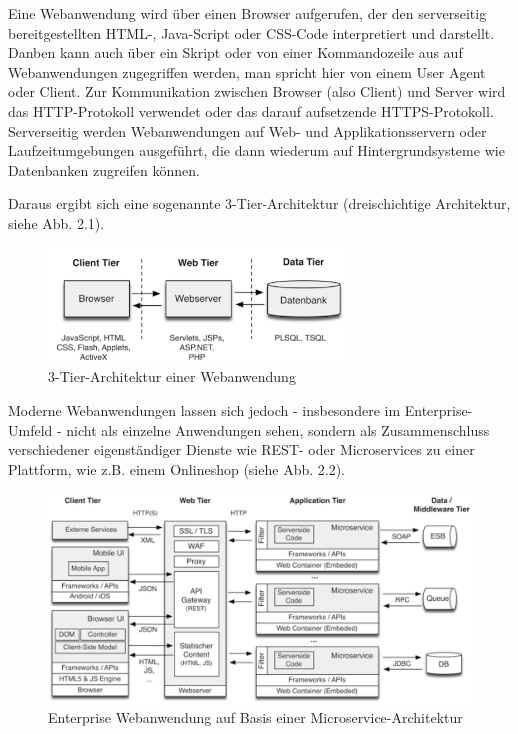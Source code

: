 \documentclass[12pt,oneside,a4paper,parskip,pointlessnumbers]{scrbook}
\begin{document}
  Eine Webanwendung wird über einen Browser aufgerufen, der den serverseitig bereitgestellten HTML-, Java-Script oder CSS-Code interpretiert und darstellt. Danben kann auch über ein Skript oder von einer Kommandozeile aus auf Webanwendungen zugegriffen werden, man spricht hier von einem User Agent oder Client.
  Zur Kommunikation zwischen Browser (also Client) und Server wird das HTTP-Protokoll verwendet oder das darauf aufsetzende HTTPS-Protokoll.
  Serverseitig werden Webanwendungen auf Web- und Applikationsservern oder Laufzeitumgebungen ausgeführt, die dann wiederum auf Hintergrundsysteme wie Datenbanken zugreifen können.

  Daraus ergibt sich eine sogenannte 3-Tier-Architektur (dreischichtige Architektur, siehe Abb. 2.1).
  \begin{figure}[H]
    \centering
     \includegraphics[width=0.7\textwidth]{Images/3_Tier_Architektur}
    \caption[3-Tier-Architektur einer Webanwendung]{3-Tier-Architektur einer Webanwendung \cite{Rohr}}
  \end{figure}

  Moderne Webanwendungen lassen sich jedoch - insbesondere im Enterprise-Umfeld - nicht als einzelne Anwendungen sehen, sondern als Zusammenschluss verschiedener eigenständiger Dienste wie REST- oder Microservices zu einer Plattform, wie z.B. einem Onlineshop (siehe Abb. 2.2).
  \begin{figure}[H]
    \centering
     \includegraphics[width=1\textwidth]{Images/Enterprise}
    \caption[Enterprise Webanwendung auf Basis einer Microservice-Architektur]{Enterprise Webanwendung auf Basis einer Microservice-Architektur \cite{Rohr}}
  \end{figure}
\end{document}
